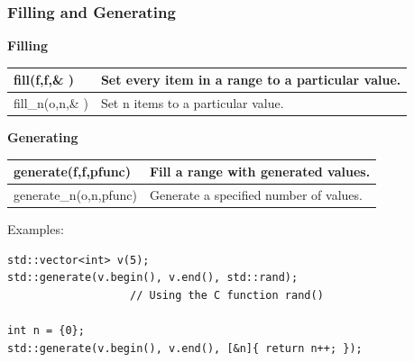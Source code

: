 \documentclass[a4paper,11pt,twoside]{book}
\newcommand{\tophline}{\hline }
\newcommand{\bottomhline}{\\ \hline }
\newcommand{\tophline}{ }
\newcommand{\bottomhline}{ }
\begin{document}
\subsubsection{Filling and Generating}
\textbf{Filling} \\
\begin{tabular}{| p{} |p{}|}
\tophline fill(f,f,\& ) & Set every item in a range to a particular value.  \\
\tophline fill\_n(o,n,\& )  & Set n items to a particular value.   \bottomhline
\end{tabular}


\textbf{Generating} \\
\begin{tabular}{| p{} |p{}|}
\tophline generate(f,f,pfunc)  & Fill a range with generated values.   \\
\tophline generate\_n(o,n,pfunc)  & Generate a specified number of values.   \bottomhline
\end{tabular}
Examples:
\begin{lstlisting}[numbers=none]
std::vector<int> v(5);
std::generate(v.begin(), v.end(), std::rand);
                   // Using the C function rand()

int n = {0};
std::generate(v.begin(), v.end(), [&n]{ return n++; });
\end{lstlisting}
\end{document}
